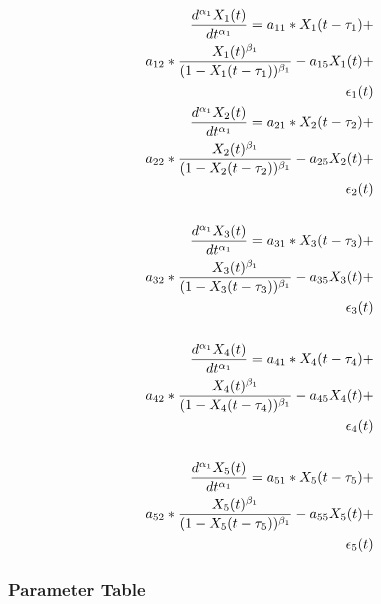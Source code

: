 \documentclass[preprint, 8pt]{elsarticle}
\theoremstyle{definition}
\begin{document}
\begin{align*} 
\tiny
\frac{d^{\alpha_1}X_1(t)}{dt^{\alpha_1}} = a_{11} *X_1(t - \tau_1) + \\
a_{12} *\frac{X_1(t)^{\beta_1}}{(1-X_1(t - \tau_1))^{\beta_1}} - a_{15}X_1(t) + \\
\epsilon_1(t) \\
\frac{d^{\alpha_1}X_2(t)}{dt^{\alpha_1}} = a_{21} *X_2(t - \tau_2) + \\
a_{22} *\frac{X_2(t)^{\beta_1}}{(1-X_2(t - \tau_2))^{\beta_1}} - a_{25}X_2(t) + \\
\epsilon_2(t) \\ \\
\frac{d^{\alpha_1}X_3(t)}{dt^{\alpha_1}} = a_{31} *X_3(t - \tau_3) + \\
a_{32} *\frac{X_3(t)^{\beta_1}}{(1-X_3(t - \tau_3))^{\beta_1}} - a_{35}X_3(t) + \\
\epsilon_3(t) \\ \\
\frac{d^{\alpha_1}X_4(t)}{dt^{\alpha_1}} = a_{41} *X_4(t - \tau_4) + \\
a_{42} *\frac{X_4(t)^{\beta_1}}{(1-X_4(t - \tau_4))^{\beta_1}} - a_{45}X_4(t) + \\
\epsilon_4(t) \\ \\
\frac{d^{\alpha_1}X_5(t)}{dt^{\alpha_1}} = a_{51} *X_5(t - \tau_5) + \\
a_{52} *\frac{X_5(t)^{\beta_1}}{(1-X_5(t - \tau_5))^{\beta_1}} - a_{55}X_5(t) + \\
\epsilon_5(t) \\
\end{align*}

\subsubsection{Parameter Table}
\end{document}
